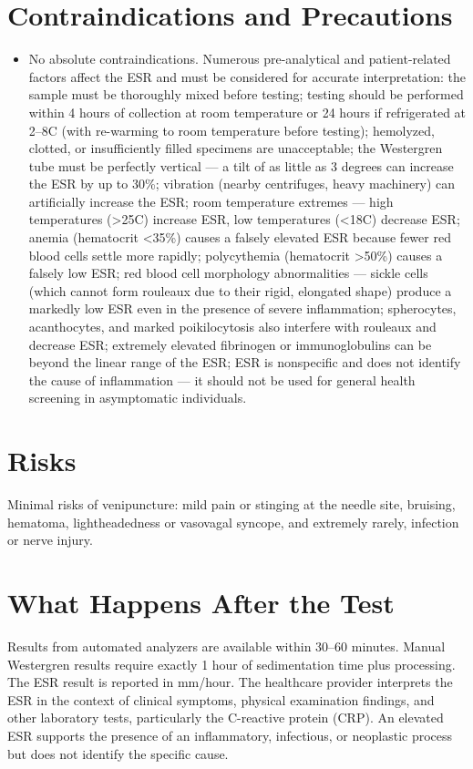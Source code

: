 \section*{Contraindications and Precautions}
\begin{itemize}
  \item No absolute contraindications. Numerous pre-analytical and patient-related factors affect the ESR and must be considered for accurate interpretation: the sample must be thoroughly mixed before testing; testing should be performed within 4 hours of collection at room temperature or 24 hours if refrigerated at 2--8\textdegree{}C (with re-warming to room temperature before testing); hemolyzed, clotted, or insufficiently filled specimens are unacceptable; the Westergren tube must be perfectly vertical --- a tilt of as little as 3 degrees can increase the ESR by up to 30\%; vibration (nearby centrifuges, heavy machinery) can artificially increase the ESR; room temperature extremes --- high temperatures (>25\textdegree{}C) increase ESR, low temperatures (<18\textdegree{}C) decrease ESR; anemia (hematocrit <35\%) causes a falsely elevated ESR because fewer red blood cells settle more rapidly; polycythemia (hematocrit >50\%) causes a falsely low ESR; red blood cell morphology abnormalities --- sickle cells (which cannot form rouleaux due to their rigid, elongated shape) produce a markedly low ESR even in the presence of severe inflammation; spherocytes, acanthocytes, and marked poikilocytosis also interfere with rouleaux and decrease ESR; extremely elevated fibrinogen or immunoglobulins can be beyond the linear range of the ESR; ESR is nonspecific and does not identify the cause of inflammation --- it should not be used for general health screening in asymptomatic individuals.
\end{itemize}
\section*{Risks}
Minimal risks of venipuncture: mild pain or stinging at the needle site, bruising, hematoma, lightheadedness or vasovagal syncope, and extremely rarely, infection or nerve injury.

\section*{What Happens After the Test}
Results from automated analyzers are available within 30--60 minutes. Manual Westergren results require exactly 1 hour of sedimentation time plus processing. The ESR result is reported in mm/hour. The healthcare provider interprets the ESR in the context of clinical symptoms, physical examination findings, and other laboratory tests, particularly the C-reactive protein (CRP). An elevated ESR supports the presence of an inflammatory, infectious, or neoplastic process but does not identify the specific cause.

